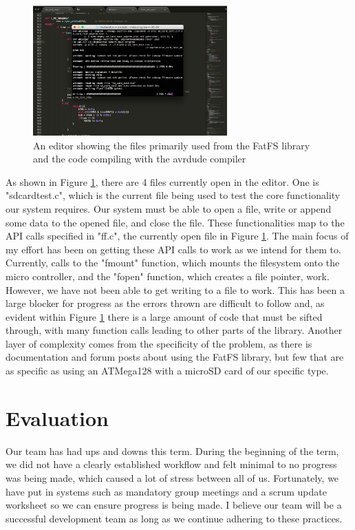 \documentclass[letterpaper,10pt]{article}
\begin{document}
\begin{figure}[H]
\begin{center}
\includegraphics[height=5cm,width=\linewidth,keepaspectratio]{code.png}
\caption{An editor showing the files primarily used from the FatFS library and the code compiling with the avrdude compiler}
\label{fig:code}
\end{center}
\end{figure}
As shown in Figure \ref{fig:code}, there are 4 files currently open in the editor. One is "sdcardtest.c", 
which is the current file being used to test the core functionality our system requires. Our system must 
be able to open a file, write or append some data to the opened file, and close the file. 
These functionalities map to the API calls specified in "ff.c", the currently open file in Figure 
\ref{fig:code}. The main focus of my effort has been on getting these API calls to work as we intend
for them to. Currently, calls to the "fmount" function, which mounts the filesystem onto the micro
controller, and the "fopen" function, which creates a file pointer, work. However, we have not
been able to get writing to a file to work. This has been a large blocker for progress as the errors thrown
are difficult to follow and, as evident within Figure \ref{fig:code} there is a large amount of code that
must be sifted through, with many function calls leading to other parts of the library. Another layer
of complexity comes from the specificity of the problem, as there is documentation and forum
posts about using the FatFS library, but few that are as specific as using an ATMega128 with
a microSD card of our specific type.


\section{Evaluation}
Our team has had ups and downs this term. During the beginning of the term, we did not have a clearly
established workflow and felt minimal to no progress was being made, which caused a lot of stress
between all of us. Fortunately, we have put in systems such as mandatory group meetings and a scrum
update worksheet so we can ensure progress is being made. I believe our team will be a successful
development team as long as we continue adhering to these practices.
\end{document}
